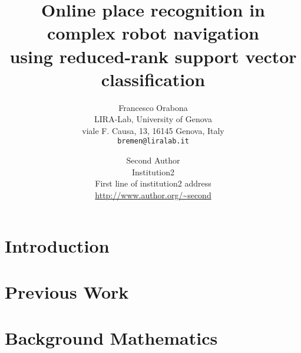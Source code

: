 \documentclass[10pt,twocolumn,letterpaper]{article}
\begin{document}

\title{Online place recognition in complex robot navigation \\
using reduced-rank support vector classification}

\author{Francesco Orabona\\
LIRA-Lab, University of Genova\\
viale F. Causa, 13, 16145 Genova, Italy\\
{\tt\small bremen@liralab.it}
\and
Second Author\\
Institution2\\
First line of institution2 address\\
{\small\url{http://www.author.org/~second}}
}

\maketitle


\begin{abstract}

\end{abstract}

\section{Introduction}
\label{introduction}


\section{Previous Work}
\label{prev-work}



\section{Background Mathematics}
\label{sec:bg}

\end{document}
